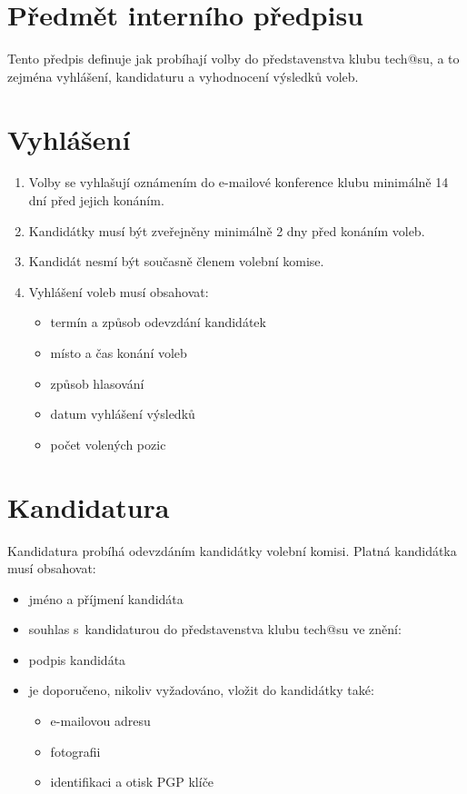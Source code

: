 \documentclass[10pt]{article}
\begin{document}
\section{Předmět interního předpisu}
	Tento předpis definuje jak probíhají volby do představenstva klubu tech@su, a to zejména vyhlášení, kandidaturu a vyhodnocení výsledků voleb.

\section{Vyhlášení}
	\begin{enumerate}
		\item Volby se vyhlašují oznámením do e-mailové konference klubu minimálně 14 dní před jejich konáním.
		\item Kandidátky musí být zveřejněny minimálně 2 dny před konáním voleb.
		\item Kandidát nesmí být současně členem volební komise.
		\item Vyhlášení voleb musí obsahovat:
			\begin{itemize}
				\item termín a způsob odevzdání kandidátek
				\item místo a čas konání voleb
				\item způsob hlasování
				\item datum vyhlášení výsledků
				\item počet volených pozic
			\end{itemize}
	\end{enumerate}
	
\section{Kandidatura}
	Kandidatura probíhá odevzdáním kandidátky volební komisi. Platná kandidátka musí obsahovat:
	\begin{itemize}
		\item jméno a příjmení kandidáta
		\item souhlas s~kandidaturou do představenstva klubu tech@su ve znění: 
		\item podpis kandidáta
		\item je doporučeno, nikoliv vyžadováno, vložit do kandidátky také: 
			\begin{itemize}
				\item e-mailovou adresu
				\item fotografii
				\item identifikaci a otisk PGP klíče
			\end{itemize}
	\end{itemize}
\end{document}
